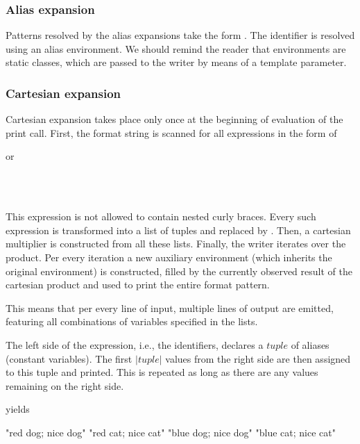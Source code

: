 \subsubsection{Alias expansion}

Patterns resolved by the alias expansions take the form \ttt{\$<[a-zA-Z]+>}. The identifier is resolved using an alias environment. We should remind the reader that environments are static classes, which are passed to the writer by means of a template parameter.


\subsubsection{Cartesian expansion}
Cartesian expansion takes place only once at the beginning of evaluation of the print call. First, the format string is scanned for all expressions in the form of \\ \centerline{ or} \\ \centerline{} \\ This expression is not allowed to contain nested curly braces. Every such expression is transformed into a list of tuples and replaced by .  Then, a cartesian multiplier is constructed from all these lists. Finally, the writer iterates over the product. Per every iteration a new auxiliary environment (which inherits the original environment) is constructed, filled by the currently observed result of the cartesian product and used to print the entire format pattern.

This means that per every line of input, multiple lines of output are emitted, featuring all combinations of variables specified in the lists.

The left side of the expression, i.e., the identifiers, declares a $tuple$ of aliases (constant variables). The first $|tuple|$ values from the right side are then assigned to this tuple and printed. This is repeated as long as there are any values remaining on the right side.

\mybeginfig
{}
yields
\begin{code}
"red dog; nice dog"
"red cat; nice cat"
"blue dog; nice dog"
"blue cat; nice cat"
\end{code}

